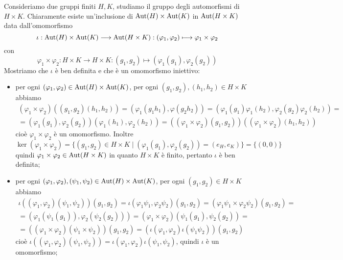 \documentclass[11pt]{scrartcl}
\begin{document}
Consideriamo due gruppi finiti $H, K$, studiamo il gruppo degli automorfismi 
di $H\times K$. Chiaramente esiste un'inclusione di $\operatorname{Aut}(H)\times \operatorname{Aut}(K)$ in 
$\operatorname{Aut}(H\times K)$ data dall'omomorfismo 
\[
    \iota: \operatorname{Aut}(H)\times \operatorname{Aut}(K)\longrightarrow \operatorname{Aut}(H\times K) :
    (\varphi_1, \varphi_2)\longmapsto \varphi_1\times \varphi_2
\]con 
\[
    \varphi_1\times\varphi_2: H\times K \longrightarrow H\times K:
    (g_1, g_2)\longmapsto (\varphi_1(g_1), \varphi_2(g_2))
\]
Mostriamo che $\iota$ è ben definita e che è un omomorfismo iniettivo:
\begin{itemize}
    \item per ogni $(\varphi_1, \varphi_2)\in \operatorname{Aut}(H)\times \operatorname{Aut}(K)$, per ogni
     $(g_1, g_2), (h_1, h_2)\in H\times K$ abbiamo 
     \begin{multline*}
        (\varphi_1\times\varphi_2)((g_1, g_2)(h_1, h_2)) = 
        (\varphi_1(g_1h_1), \varphi(g_2h_2)) = 
        (\varphi_1(g_1)\varphi_1(h_2), \varphi_2(g_2)\varphi_2(h_2)) = \\
        =(\varphi_1(g_1), \varphi_2(g_2))(\varphi_1(h_1),\varphi_2(h_2)) = 
        ((\varphi_1\times\varphi_2)(g_1, g_2))((\varphi_1\times\varphi_2)(h_1,h_2))
     \end{multline*}
     cioè $\varphi_1\times\varphi_2$ è un omomorfismo. Inoltre 
    \[
        \ker (\varphi_1\times\varphi_2) = \{(g_1, g_2) \in H\times K\mid 
        (\varphi_1(g_1), \varphi_2(g_2)) = (e_H, e_K)\} = \{(0, 0)\}
    \]
    quindi $\varphi_1\times \varphi_2 \in \operatorname{Aut}(H\times K)$
    in quanto $H\times K$ è finito, pertanto $\iota$ è ben definita;
    \item per ogni $(\varphi_1, \varphi_2), (\psi_1, \psi_2) \in \operatorname{Aut}(H)\times \operatorname{Aut}(K)$,
    per ogni $(g_1, g_2) \in H\times K$ abbiamo 
    \begin{multline*}
        \iota((\varphi_1, \varphi_2)(\psi_1, \psi_2))(g_1, g_2) = 
        \iota(\varphi_1\psi_1, \varphi_2\psi_2)(g_1, g_2) = 
        (\varphi_1\psi_1\times\varphi_2\psi_2)(g_1, g_2) =\\
        = (\varphi_1(\psi_1(g_1)), \varphi_2(\psi_2(g_2))) = 
        (\varphi_1\times\varphi_2)(\psi_1(g_1), \psi_2(g_2)) = \\
        = ((\varphi_1\times\varphi_2)(\psi_1\times\psi_2))(g_1, g_2) = 
        (\iota(\varphi_1, \varphi_2)\iota(\psi_1\psi_2))(g_1, g_2)
    \end{multline*}cioè $\iota((\varphi_1, \varphi_2)(\psi_1, \psi_2)) = 
    \iota(\varphi_1, \varphi_2)\iota(\psi_1, \psi_2)$, quindi $\iota$ è un 
    omomorfismo;

\end{itemize}
\end{document}
